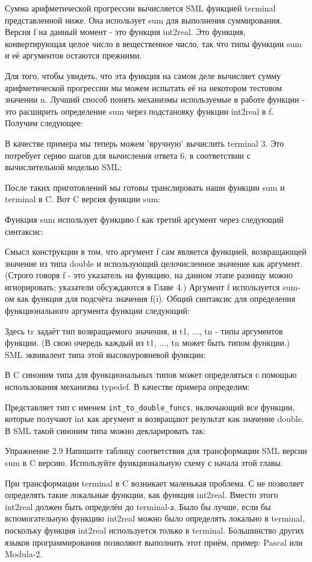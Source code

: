 Сумма арифметической прогрессии вычисляется SML функцией terminal представленной ниже. Она использует sum для выполнения суммирования. Версия f на данный момент - это функция int2real. Это функция, конвертирующая целое число в вещественное число, так что типы функции sum и её аргументов остаются прежними.

Для того, чтобы увидеть, что эта функция на самом деле вычисляет сумму арифметической прогрессии мы можем испытать её на некотором тестовом значении n. Лучший способ понять механизмы используемые в работе функции - это расширить определение sum через подстановку функции int2real в f. Получим следующее:

В качестве примера мы теперь можем 'вручную' вычислить terminal 3. Это потребует серию шагов для вычисления ответа 6, в соответствии с вычислительной моделью SML:

После таких приготовлений мы готовы транслировать наши функции sum и terminal в C. Вот C версия функции sum:

Функция sum использует функцию f как третий аргумент через следующий синтаксис:

Смысл конструкции в том, что аргумент f сам является функцией, возвращающей значение из типа double и использующий целочисленное значение как аргумент. (Строго говоря f - это указатель на функцию, на данном этапе разницу можно игнорировать; указатели обсуждаются в Главе 4.) Аргумент f используется sum-ом как функция для подсчёта значения f(i). Общий синтаксис для определения функционального аргумента функции следующий:

Здесь tr задаёт тип возвращаемого значения, и t1, ..., tn - типы аргументов функции. (В свою очередь каждый из t1, ..., tn может быть типом функции.) SML эквивалент типа этой высокоуровневой функции:

В C синоним типа для функциональных типов может определяться с помощью использования механизма typedef. В качестве примера определим:

Представляет тип с именем \lstinline|int_to_double_funcs|, включающий все функции, которые получают int как аргумент и возвращают результат как значение double. В SML такой синоним типа можно декларировать так:

Упражнение 2.9 Напишите таблицу соответствия для трансформации SML версии sum в C версию. Используйте функциональную схему с начала этой главы.

При трансформации terminal в C возникает маленькая проблема. С не позволяет определять такие локальные функции, как функция int2real. Вместо этого int2real должен быть определён до terminal-а. Было бы лучше, если бы вспомогательную функцию int2real можно было определять локально в terminal, поскольку функция int2real используется только в terminal. Большинство других языков программирования позволяют выполнить этот приём, пример: Pascal или Modula-2.

